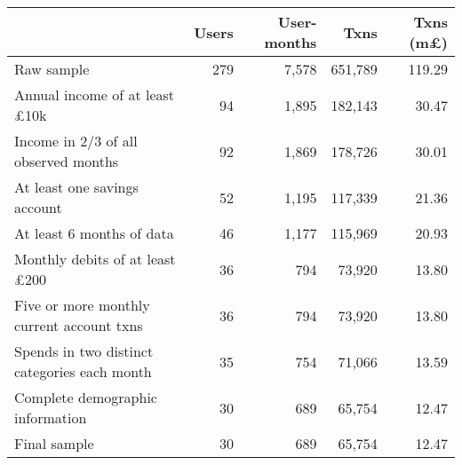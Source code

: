 \begin{tabular}{lrrrr}
\toprule
                                             & Users & User-months &    Txns & Txns (m\pounds) \\
\midrule
                                  Raw sample &   279 &       7,578 & 651,789 &          119.29 \\
        Annual income of at least \pounds10k &    94 &       1,895 & 182,143 &           30.47 \\
        Income in 2/3 of all observed months &    92 &       1,869 & 178,726 &           30.01 \\
                At least one savings account &    52 &       1,195 & 117,339 &           21.36 \\
                   At least 6 months of data &    46 &       1,177 & 115,969 &           20.93 \\
       Monthly debits of at least \pounds200 &    36 &         794 &  73,920 &           13.80 \\
   Five or more monthly current account txns &    36 &         794 &  73,920 &           13.80 \\
Spends in two distinct categories each month &    35 &         754 &  71,066 &           13.59 \\
            Complete demographic information &    30 &         689 &  65,754 &           12.47 \\
                                Final sample &    30 &         689 &  65,754 &           12.47 \\
\bottomrule
\end{tabular}
